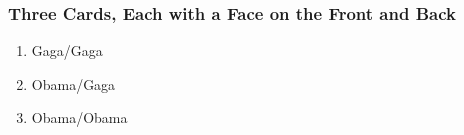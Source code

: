 \documentclass[handout]{beamer}
\begin{document}
\begin{frame}
\frametitle{Three Cards, Each with a Face on the Front and Back}
\begin{figure}
\hspace{1em}
\end{figure}
\begin{enumerate}
	\item Gaga/Gaga
	\item Obama/Gaga
	\item Obama/Obama
\end{enumerate} \pause

\end{frame}
\end{document}
